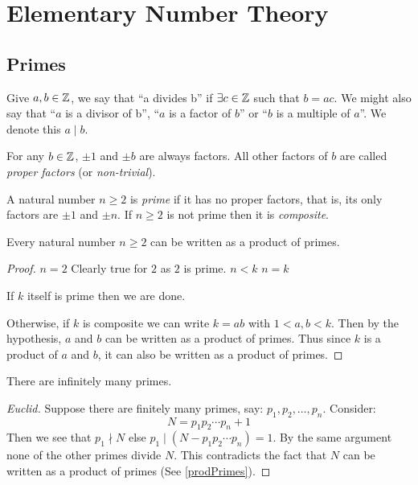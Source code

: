 \documentclass[../main.tex]{subfiles}
\begin{document}
\chapter{Elementary Number Theory}
\section{Primes}
\begin{definition}[Divisibility]
  Give $a, b \in \mathbb{Z}$, we say that ``a divides b'' if $\exists c \in \mathbb{Z}$ such that $b = ac$.
  We might also say that ``$a$ is a divisor of b'', ``$a$ is a factor of $b$'' or ``$b$ is a multiple of $a$''.
  We denote this $a \mid b$.
\end{definition}
For any $b \in \mathbb{Z}$, $\pm1$ and $\pm b$ are always factors.
All other factors of $b$ are called \textit{proper factors} (or \textit{non-trivial}).
\begin{definition}
  A natural number $n \geq 2$ is \textit{prime} if it has no proper factors, that is, its only factors are $\pm 1$ and $\pm n$.
  If $n \geq 2$ is not prime then it is \textit{composite}.
\end{definition}
\begin{proposition}
  Every natural number $n \geq 2$ can be written as a product of primes.
  \label{prodPrimes}
\end{proposition}
\begin{proof}
  \induction
  {$n = 2$}{
    Clearly true for $2$ as $2$ is prime.
  }
  {$n < k$}{}
  {$n = k$}{
     If $k$ itself is prime then we are done.

     Otherwise, if $k$ is composite we can write $k = ab$ with $1 < a, b < k$.
     Then by the hypothesis, $a$ and $b$ can be written as a product of primes.
     Thus since $k$ is a product of $a$ and $b$, it can also be written as a product of primes.
  }
\end{proof}
\begin{theorem}
  There are infinitely many primes.
  \label{infinityPrimes}
\end{theorem}
\begin{proof}[Euclid]
  Suppose there are finitely many primes, say: $p_1, p_2, \ldots, p_n$. Consider:
  \[
    N = p_1 p_2 \cdots p_n + 1
  \]
  Then we see that $p_1 \nmid N$ else $p_1 \mid (N - p_1 p_2 \cdots p_n) = 1$.
  By the same argument none of the other primes divide $N$.
  This contradicts the fact that $N$ can be written as a product of primes (See \cref{prodPrimes}).
\end{proof}
\end{document}
